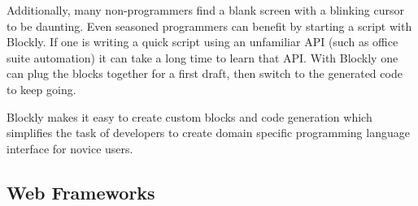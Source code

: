Additionally, many non-programmers find a blank screen with a blinking cursor to be daunting. Even seasoned programmers can benefit by starting a script with Blockly. If one is writing a quick script using an unfamiliar API (such as office suite automation) it can take a long time to learn that API. With Blockly one can plug the blocks together for a first draft, then switch to the generated code to keep going. 

Blockly makes it easy to create custom blocks and code generation which simplifies the task of developers to create domain specific programming language interface for novice users.

\subsection{Web Frameworks}